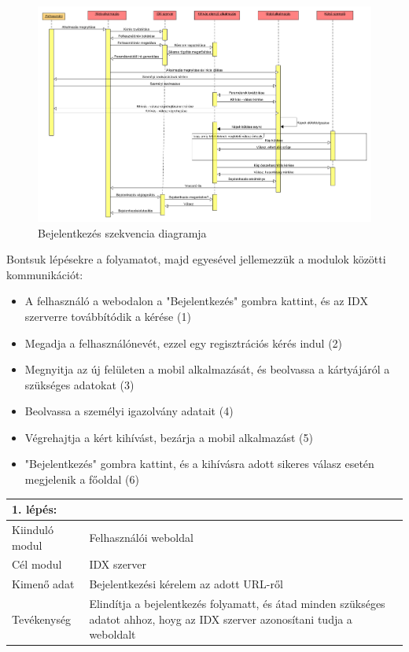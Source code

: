 \begin{figure}
\centering
         \includegraphics[scale=0.47]{img/szekvencia}
    \caption{Bejelentkezés szekvencia diagramja}
\end{figure}


\newpage
Bontsuk lépésekre a folyamatot, majd egyesével jellemezzük a modulok közötti kommunikációt:
\begin{itemize}
\item A felhasználó a webodalon a "Bejelentkezés" gombra kattint, és az IDX szerverre továbbítódik a kérése (1)
\item Megadja a felhasználónevét, ezzel egy regisztrációs kérés indul (2)
\item Megnyitja az új felületen a mobil alkalmazását, és beolvassa a kártyájáról a szükséges adatokat (3)
\item Beolvassa a személyi igazolvány adatait (4)
\item Végrehajtja a kért kihívást, bezárja a mobil alkalmazást  (5)
\item "Bejelentkezés" gombra kattint, és a kihívásra adott sikeres válasz esetén megjelenik a főoldal (6)
\end{itemize}


\begin{tabular}{|p{3cm}|p{10cm} |}
   	\hline
	\textbf{1. lépés:} & \textbf{}\\ \hline
	Kiinduló modul & Felhasználói weboldal \\ \hline
	Cél modul & IDX szerver \\ \hline
	Kimenő adat & Bejelentkezési kérelem az adott URL-ről \\ \hline
	Tevékenység & Elindítja a bejelentkezés folyamatt, és átad minden szükséges adatot ahhoz, hoyg az IDX szerver azonosítani tudja a weboldalt \\ \hline
\end{tabular}


